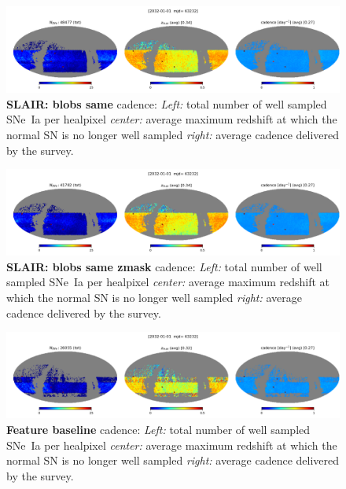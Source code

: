 \begin{figure}[h!]
  \begin{center}
    \includegraphics[width=\linewidth]{Figures/blobs_same_10yrs_64_maps.png}
    \caption{{\bf SLAIR: blobs same} cadence: {\em Left:} total number of well
      sampled SNe~Ia per healpixel {\em center:} average maximum
      redshift at which the normal SN is no longer well sampled {\em
        right:} average cadence delivered by the survey.}
    \label{fig:blobs_same}
  \end{center}
\end{figure}

\begin{figure}[h!]
  \begin{center}
    \includegraphics[width=\linewidth]{Figures/blobs_same_zmask10yrs_64_maps.png}
    \caption{{\bf SLAIR: blobs same zmask} cadence: {\em Left:} total number of well
      sampled SNe~Ia per healpixel {\em center:} average maximum
      redshift at which the normal SN is no longer well sampled {\em
        right:} average cadence delivered by the survey.}
    \label{fig:blobs_same_zmask}
  \end{center}
\end{figure}

\begin{figure}[h!]
  \begin{center}
    \includegraphics[width=\linewidth]{Figures/feature_baseline_10yrs_64_maps.png}
    \caption{{\bf Feature baseline} cadence: {\em Left:} total number of well
      sampled SNe~Ia per healpixel {\em center:} average maximum
      redshift at which the normal SN is no longer well sampled {\em
        right:} average cadence delivered by the survey.}
    \label{fig:feature_baseline}
  \end{center}
\end{figure}






